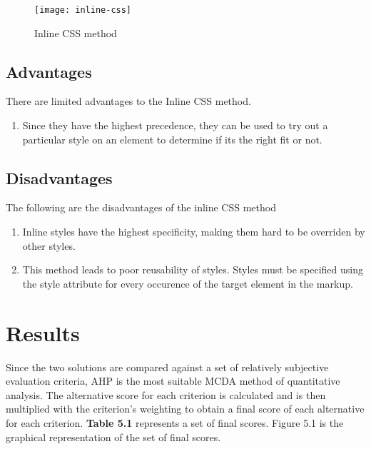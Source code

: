 \documentclass[12pt]{article}
\begin{document}
\vspace{0.5cm}

\begin{figure}[h]
\texttt{[image: inline-css]}
\centering
\caption{Inline CSS method}
\end{figure}

\subsection{Advantages}
There are limited advantages to the Inline CSS method.
\begin{enumerate}
	\item Since they have the highest precedence, they can be used to try out a particular style on an element to determine if its the right fit or not.
\end{enumerate}

\subsection{Disadvantages}
The following are the disadvantages of the inline CSS method
\begin{enumerate}
	\item Inline styles have the highest specificity, making them hard to be overriden by other styles.

	\item This method leads to poor reusability of styles. Styles must be specified using the style attribute for every occurence of the target element in the markup.
\end{enumerate}


\newpage

\section{Results}
Since the two solutions are compared against a set of relatively subjective evaluation criteria, AHP is the most suitable MCDA method of quantitative analysis. The alternative score for each criterion is calculated and is then multiplied with the criterion’s weighting to obtain a final score of each alternative for each criterion. \textbf{Table 5.1} represents a set of final scores. Figure 5.1 is the graphical representation of the set of final scores.

\vspace{0.5cm}
\end{document}
